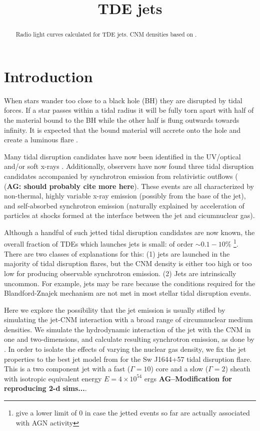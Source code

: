 \documentclass[usenatbib,fleqn]{mnras}
\title{TDE jets}
\begin{document}
\begin{abstract}
  Radio light curves calculated for TDE jets. CNM
  densities based on \citet{Generozov+2015}. 
\end{abstract}
\section{Introduction}
\label{sec:intro}
When stars wander too close to a black hole (BH) they are disrupted by
tidal forces. If a star passes within a tidal radius it will be fully
torn apart with half of the material bound to the BH while the
other half is flung outwards towards infinity. It is expected that the
bound material will accrete onto the hole and create a luminous flare
\citep{Hills1975, Carter+1982, Rees1988}. 

Many tidal disruption candidates have now been identified in the
UV/optical \citep{van-Velzen+2011, Gezari+2012, Chornock+2014,
  Arcavi+2014} and/or soft x-rays \citep{Esquej+2007}. Additionally,
observers have now found three tidal disruption candidates accompanied
by synchrotron emission from relativistic outflows
(\citealt{Bloom+2011, Zauderer+2011, Cenko+2012, Brown+2015} ({\bf AG:
  should probably cite more here}). These events are all characterized
by non-thermal, highly variable x-ray emission (possibly from the base
of the jet), and self-absorbed synchrotron emission (naturally
explained by acceleration of particles at shocks formed at the
interface between the jet and cicumnuclear gas).

Although a handful of such jetted tidal disruption candidates are
now known, the overall fraction of TDEs which launches jets is small:
of order $\sim 0.1-10\%$
\citep{van-Velzen+2013}\footnote{\citet{van-Velzen+2013} give a lower
  limit of 0 in case the jetted events so far are actually associated
  with AGN activity}.  There are two classes of explanations for this:
(1) jets are launched in the majority of tidal disruption flares, but
the CNM density is either too high or too low for producing observable
synchrotron emission. (2) Jets are intrinsically uncommon. For
example, jets may be rare because the conditions required for the
Blandford-Znajek mechanism are not met in most stellar tidal
disruption events.

Here we explore the possibility that the jet emission is usually
stifled by simulating the jet-CNM interaction with a broad range of
circumnuclear medium densities. We simulate the hydrodynamic
interaction of the jet with the CNM in one and two-dimensions, and
calculate resulting synchrotron emission, as done by
\citet{Mimica+2015}. In order to isolate the effects of varying the
nuclear gas density, we fix the jet properties to the best jet model
from \citet{Mimica+2015} for the Sw J1644+57 tidal disruption flare.
This is a two component jet with a fast ($\Gamma=10$) core and a slow
($\Gamma=2$) sheath with isotropic equivalent energy $E=4 \times
10^{54}$ ergs {\bf AG--Modification for reproducing 2-d sims...}.
\end{document}
